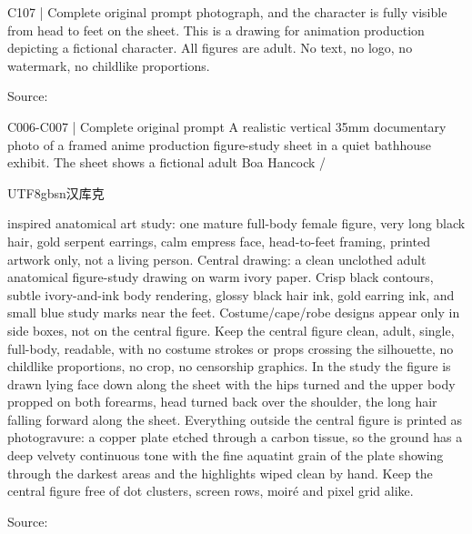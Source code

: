 \begin{selectedprompt}{C107 | Complete original prompt}
photograph, and the character is fully visible from head to feet on the sheet. This is a drawing for animation production depicting a fictional character. All figures are adult. No text, no logo, no watermark, no childlike proportions.
\end{selectedprompt}
{\scriptsize Source: \par}

\begin{selectedprompt}{C006-C007 | Complete original prompt}
\label{prompt:selected-C006-C007}
A realistic vertical 35mm documentary photo of a framed anime production figure-study sheet in a quiet bathhouse exhibit. The sheet shows a fictional adult Boa Hancock / \begin{CJK*}{UTF8}{gbsn}汉库克\end{CJK*} inspired anatomical art study: one mature full-body female figure, very long black hair, gold serpent earrings, calm empress face, head-to-feet framing, printed artwork only, not a living person. Central drawing: a clean unclothed adult anatomical figure-study drawing on warm ivory paper. Crisp black contours, subtle ivory-and-ink body rendering, glossy black hair ink, gold earring ink, and small blue study marks near the feet. Costume/cape/robe designs appear only in side boxes, not on the central figure. Keep the central figure clean, adult, single, full-body, readable, with no costume strokes or props crossing the silhouette, no childlike proportions, no crop, no censorship graphics. In the study the figure is drawn lying face down along the sheet with the hips turned and the upper body propped on both forearms, head turned back over the shoulder, the long hair falling forward along the sheet. Everything outside the central figure is printed as photogravure: a copper plate etched through a carbon tissue, so the ground has a deep velvety continuous tone with the fine aquatint grain of the plate showing through the darkest areas and the highlights wiped clean by hand. Keep the central figure free of dot clusters, screen rows, moiré and pixel grid alike.
\end{selectedprompt}
{\scriptsize Source: \par}

\clearpage
